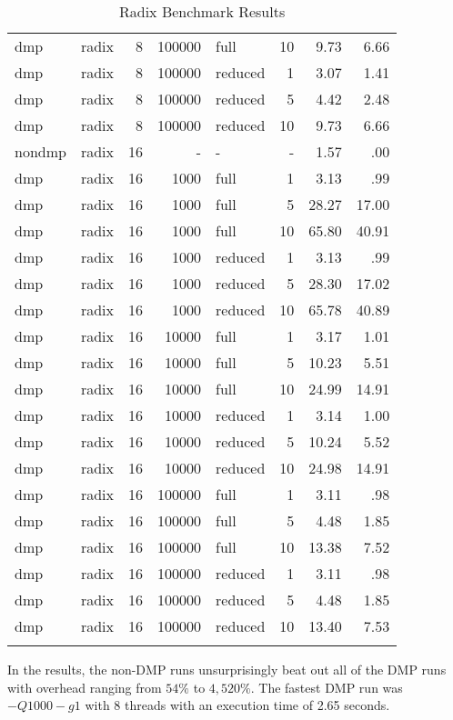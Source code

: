 \begin{center}
\begin{small}
\begin{longtable}{llrrlrrr}
dmp & radix & 8 & 100000 & full & 10 & 9.73 & 6.66\\
dmp & radix & 8 & 100000 & reduced & 1 & 3.07 & 1.41\\
dmp & radix & 8 & 100000 & reduced & 5 & 4.42 & 2.48\\
dmp & radix & 8 & 100000 & reduced & 10 & 9.73 & 6.66\\
nondmp & radix & 16 & - & - & - & 1.57 & .00\\
dmp & radix & 16 & 1000 & full & 1 & 3.13 & .99\\
dmp & radix & 16 & 1000 & full & 5 & 28.27 & 17.00\\
dmp & radix & 16 & 1000 & full & 10 & 65.80 & 40.91\\
dmp & radix & 16 & 1000 & reduced & 1 & 3.13 & .99\\
dmp & radix & 16 & 1000 & reduced & 5 & 28.30 & 17.02\\
dmp & radix & 16 & 1000 & reduced & 10 & 65.78 & 40.89\\
dmp & radix & 16 & 10000 & full & 1 & 3.17 & 1.01\\
dmp & radix & 16 & 10000 & full & 5 & 10.23 & 5.51\\
dmp & radix & 16 & 10000 & full & 10 & 24.99 & 14.91\\
dmp & radix & 16 & 10000 & reduced & 1 & 3.14 & 1.00\\
dmp & radix & 16 & 10000 & reduced & 5 & 10.24 & 5.52\\
dmp & radix & 16 & 10000 & reduced & 10 & 24.98 & 14.91\\
dmp & radix & 16 & 100000 & full & 1 & 3.11 & .98\\
dmp & radix & 16 & 100000 & full & 5 & 4.48 & 1.85\\
dmp & radix & 16 & 100000 & full & 10 & 13.38 & 7.52\\
dmp & radix & 16 & 100000 & reduced & 1 & 3.11 & .98\\
dmp & radix & 16 & 100000 & reduced & 5 & 4.48 & 1.85\\
dmp & radix & 16 & 100000 & reduced & 10 & 13.40 & 7.53\\
\hline
\caption{Radix Benchmark Results}
\label{tab:radix_results}
\end{longtable}
\end{small}
\end{center}

In the results, the non-DMP runs unsurprisingly beat out all of the
DMP runs with overhead ranging from $54\%$ to $4,520\%$.  The fastest
DMP run was $-Q1000 -g1$ with 8 threads with an execution time of 2.65
seconds.

